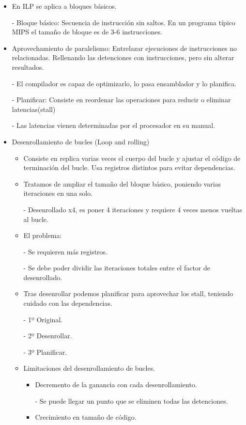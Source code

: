 \documentclass[12pt, twoside, openright]{report} %
\begin{document}
\begin{itemize}
\item En ILP se aplica a bloques básicos.
    
    - Bloque básico: Secuencia de instrucción sin saltos. En un programa típico MIPS el tamaño de bloque es de 3-6 instrucciones.
\item Aprovechamiento de paralelismo: Entrelazar ejecuciones de instrucciones no relacionadas. Rellenando las detenciones con instrucciones, pero sin alterar resultados.
   
    - El compilador es capaz de optimizarlo, lo pasa ensamblador y lo planifica.
    
    - Planificar: Consiste en reordenar las operaciones para reducir o eliminar latencias(stall)
    
    - Las latencias vienen determinadas por el procesador en su manual.
\item Desenrollamiento de bucles (Loop and rolling)
\begin{itemize}
  \item Consiste en replica varias veces el cuerpo del bucle y ajustar el código de terminación del bucle. Usa registros distintos para evitar dependencias.
  \item Tratamos de ampliar el tamaño del bloque básico, poniendo varias iteraciones en una solo.
  
      - Desenrollado x4, es poner 4 iteraciones y requiere 4 veces menos vueltas al bucle.
  \item El problema:
  
      - Se requieren más registros.

      - Se debe poder dividir las iteraciones totales entre el factor de desenrollado.
  \item Tras desenrollar podemos planificar para aprovechar los stall, teniendo cuidado con las dependencias.
  
      - 1º Original.

      - 2º Desenrollar.

      - 3º Planificar.
  \item Limitaciones del desenrollamiento de bucles.
  \begin{itemize}
    \item Decremento de la ganancia con cada desenrollamiento.
    
    - Se puede llegar un punto que se eliminen todas las detenciones.
    \item Crecimiento en tamaño de código.
    

\end{itemize}
\end{itemize}
\end{itemize}
\end{document}
